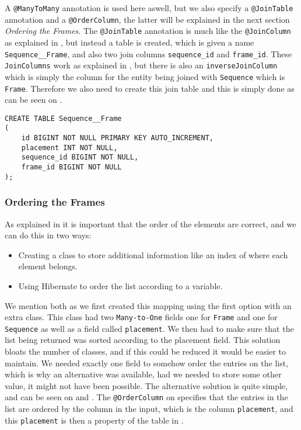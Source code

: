 A \texttt{@ManyToMany} annotation is used here aswell, but we also specify a \texttt{@JoinTable} annotation and a \texttt{@OrderColumn}, the latter will be explained in the next section \textit{Ordering the Frames}.
The \texttt{@JoinTable} annotation is much like the \texttt{@JoinColumn} as explained in , but instead a table is created, which is given a name \texttt{Sequence__Frame}, and also two join columns \texttt{sequence_id} and \texttt{frame_id}.
These \texttt{JoinColumns} work as explained in , but there is also an \texttt{inverseJoinColumn} which is simply the column for the entity being joined with \texttt{Sequence} which is \texttt{Frame}.
Therefore we also need to create this join table and this is simply done as can be seen on .

\begin{lstlisting}[float, floatplacement=h, caption={The table creation of the join table between \texttt{Sequence} and \texttt{Frame}.},label={lst:sql-frame-sequence}]
CREATE TABLE Sequence__Frame
(
    id BIGINT NOT NULL PRIMARY KEY AUTO_INCREMENT,
    placement INT NOT NULL,
    sequence_id BIGINT NOT NULL,
    frame_id BIGINT NOT NULL
);
\end{lstlisting}


\subsubsection{Ordering the Frames}

As explained in  it is important that the order of the elements are correct, and we can do this in two ways:

\begin{itemize}
	\item Creating a class to store additional information like an index of where each element belongs.
	\item Using Hibernate to order the list according to a variable.
\end{itemize}

We mention both as we first created this mapping using the first option with an extra class.
This class had two \texttt{Many-to-One} fields one for \texttt{Frame} and one for \texttt{Sequence} as well as a field called \texttt{placement}.
We then had to make sure that the list being returned was sorted according to the placement field.
This solution bloats the number of classes, and if this could be reduced it would be easier to maintain.
We needed exactly one field to somehow order the entries on the list, which is why an alternative was available, had we needed to store some other value, it might not have been possible.
The alternative solution is quite simple, and can be seen on  and .
The \texttt{@OrderColumn} on  specifies that the entries in the list are ordered by the column in the input, which is the column \texttt{placement}, and this \texttt{placement} is then a property of the table in .
